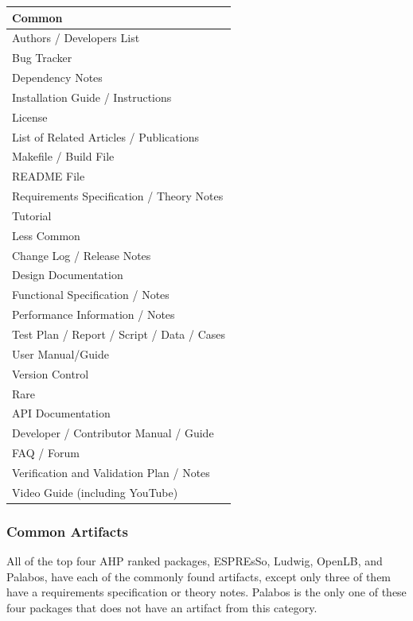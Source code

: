 \documentclass[12pt, notitlepage]{article}
\begin{document}
\begin{onehalfspace}
	\begin{center}
		\begin{tabular}{ p{8 cm} }
			\hline
			Common\\
			\hline
			Authors / Developers List\\
			Bug Tracker\\
			Dependency Notes\\
			Installation Guide / Instructions\\
			License\\
			List of Related Articles / Publications\\
			Makefile / Build File\\
			README File\\
			Requirements Specification / Theory Notes\\
			Tutorial\\
			\hline
			Less Common\\
			\hline
			Change Log / Release Notes\\
			Design Documentation\\
			Functional Specification / Notes\\
			Performance Information / Notes\\
			Test Plan / Report / Script / Data / Cases\\
			User Manual/Guide\\
			Version Control\\
			\hline
			Rare\\
			\hline
			API Documentation\\
			Developer / Contributor Manual / Guide\\
			FAQ / Forum\\
			Verification and Validation Plan / Notes\\
			Video Guide (including YouTube)\\
			\hline
		\end{tabular}
		\label{artifactspresent}
	\end{center}
\end{onehalfspace}

\subsubsection{Common Artifacts}
All of the top four AHP ranked packages, ESPREsSo, Ludwig, OpenLB, and Palabos, have each of the commonly found artifacts, except only three of them have a requirements specification or theory notes. Palabos is the only one of these four packages that does not have an artifact from this category.
\end{document}
